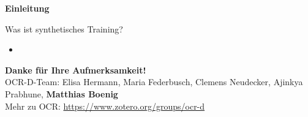 \documentclass{bbawslides}
\begin{document}
\begin{bbawpart}{\Large\bf Einleitung}
\end{bbawpart}

\begin{bbawslide}{Was ist synthetisches Training?}
  \vspace*{7mm}%
  \centerslidestrue%
  \begin{itemize}
    \item
  \end{itemize}
\end{bbawslide}

\begin{bbawpart}{\Large\bf Danke für Ihre Aufmerksamkeit!\\}
OCR-D-Team: Elisa Hermann, Maria Federbusch, Clemens Neudecker, Ajinkya Prabhune, \textbf{Matthias Boenig}\\
Mehr zu OCR: \url{https://www.zotero.org/groups/ocr-d}
\end{bbawpart}
\end{document}
